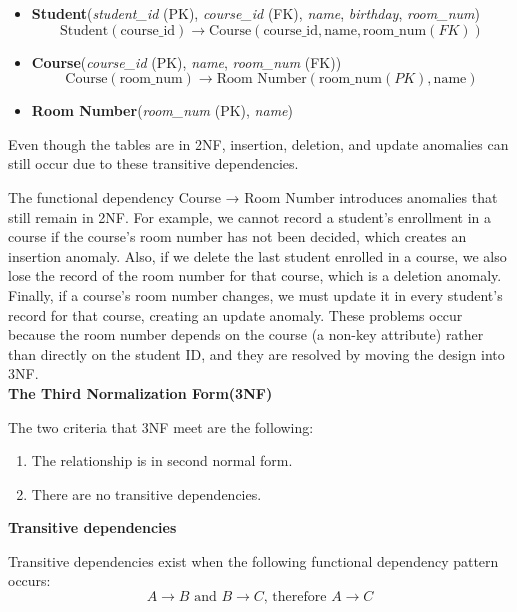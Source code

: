 \begin{itemize}
    \item \textbf{Student}(\textit{student\_id} (PK), \textit{course\_id} (FK), \textit{name}, \textit{birthday}, \textit{room\_num}) 
    \[
    \text{Student}(\text{course\_id}) \rightarrow \text{Course}(\text{course\_id}, \text{name}, \text{room\_num} (FK))
    \]
    
    \item \textbf{Course}(\textit{course\_id} (PK), \textit{name}, \textit{room\_num} (FK)) 
    \[
    \text{Course}(\text{room\_num}) \rightarrow \text{Room Number}(\text{room\_num} (PK), \text{name})
    \]
    
    \item \textbf{Room Number}(\textit{room\_num} (PK), \textit{name})
\end{itemize}



Even though the tables are in 2NF, insertion, deletion, and update anomalies can still occur due to these transitive dependencies.

The functional dependency Course → Room Number introduces anomalies that still remain in 2NF.
For example, we cannot record a student’s enrollment in a course if the course’s room number has not been decided, which creates an insertion anomaly.
Also, if we delete the last student enrolled in a course, we also lose the record of the room number for that course, which is a deletion anomaly.
Finally, if a course’s room number changes, we must update it in every student’s record for that course, creating an update anomaly.
These problems occur because the room number depends on the course (a non-key attribute) rather than directly on the student ID,
and they are resolved by moving the design into 3NF. \\

\textbf{The Third Normalization Form(3NF)}

The two criteria that 3NF meet are the following:

\begin{enumerate}
    \item The relationship is in second normal form.
    \item There are no transitive dependencies.
\end{enumerate}

\textbf{Transitive dependencies}

Transitive dependencies exist when the following functional dependency pattern occurs:  
\[
A \rightarrow B \text{ and } B \rightarrow C \text{, therefore } A \rightarrow C
\] 

